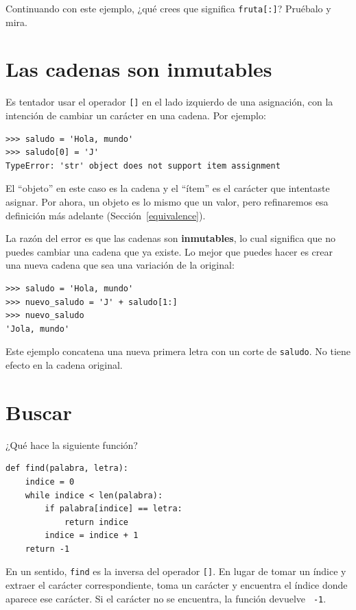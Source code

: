 \documentclass[10pt]{book}
\begin{document}
Continuando con este ejemplo, ¿qué crees que significa
{\tt fruta[:]}?  Pruébalo y mira.



\section{Las cadenas son inmutables}

Es tentador usar el operador {\tt []} en el lado izquierdo de una
asignación, con la intención de cambiar un carácter en una cadena.
Por ejemplo:

\begin{verbatim}
>>> saludo = 'Hola, mundo'
>>> saludo[0] = 'J'
TypeError: 'str' object does not support item assignment
\end{verbatim}
%
El ``objeto'' en este caso es la cadena y el ``ítem'' es
el carácter que intentaste asignar.  Por ahora, un objeto es
lo mismo que un valor, pero refinaremos esa definición
más adelante (Sección~\ref{equivalence}).

La razón del error es que
las cadenas son {\bf inmutables}, lo cual significa que no puedes cambiar una
cadena que ya existe.  Lo mejor que puedes hacer es crear una nueva cadena
que sea una variación de la original:

\begin{verbatim}
>>> saludo = 'Hola, mundo'
>>> nuevo_saludo = 'J' + saludo[1:]
>>> nuevo_saludo
'Jola, mundo'
\end{verbatim}
%
Este ejemplo concatena una nueva primera letra con
un corte de {\tt saludo}.  No tiene efecto en
la cadena original.


\section{Buscar}
\label{find}

¿Qué hace la siguiente función?

\begin{verbatim}
def find(palabra, letra):
    indice = 0
    while indice < len(palabra):
        if palabra[indice] == letra:
            return indice
        indice = indice + 1
    return -1
\end{verbatim}
%
En un sentido, {\tt find} es la inversa del operador {\tt []}.
En lugar de tomar un índice y extraer el carácter correspondiente,
toma un carácter y encuentra el índice donde aparece ese
carácter.  Si el carácter no se encuentra, la función devuelve {\tt
-1}.
\end{document}
